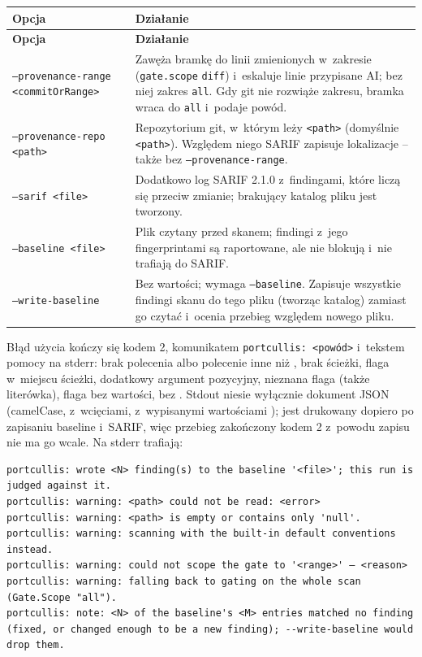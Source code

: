 \begingroup\small
\begin{xltabular}{\linewidth}{@{}>{\raggedright\arraybackslash}p{4.6cm} >{\raggedright\arraybackslash}X@{}}
\toprule
\textbf{Opcja} & \textbf{Działanie} \\
\midrule
\endfirsthead
\toprule
\textbf{Opcja} & \textbf{Działanie} \\
\midrule
\endhead
\texttt{--provenance-range <commitOrRange>} & Zawęża bramkę do linii zmienionych w~zakresie (\texttt{gate.scope} \texttt{diff}) i~eskaluje linie przypisane AI; bez niej zakres \texttt{all}. Gdy git nie rozwiąże zakresu, bramka wraca do \texttt{all} i~podaje powód. \\
\texttt{--provenance-repo <path>} & Repozytorium git, w~którym leży \texttt{<path>} (domyślnie \texttt{<path>}). Względem niego SARIF zapisuje lokalizacje -- także bez \texttt{--provenance-range}. \\
\texttt{--sarif <file>} & Dodatkowo log SARIF 2.1.0 z~findingami, które liczą się przeciw zmianie; brakujący katalog pliku jest tworzony. \\
\texttt{--baseline <file>} & Plik czytany przed skanem; findingi z~jego fingerprintami są raportowane, ale nie blokują i~nie trafiają do SARIF. \\
\texttt{--write-baseline} & Bez wartości; wymaga \texttt{--baseline}. Zapisuje wszystkie findingi skanu do tego pliku (tworząc katalog) zamiast go czytać i~ocenia przebieg względem nowego pliku. \\
\bottomrule
\end{xltabular}
\endgroup

Błąd użycia kończy się kodem 2, komunikatem \texttt{portcullis: <powód>} i~tekstem pomocy na
stderr: brak polecenia albo polecenie inne niż , brak ścieżki, flaga w~miejscu
ścieżki, dodatkowy argument pozycyjny, nieznana flaga (także literówka), flaga bez wartości,
 bez . Stdout niesie wyłącznie dokument JSON
(camelCase, z~wcięciami, z~wypisanymi wartościami ); jest drukowany dopiero po
zapisaniu baseline i~SARIF, więc przebieg zakończony kodem 2 z~powodu zapisu nie ma go wcale.
Na stderr trafiają:

\begin{lstlisting}
portcullis: wrote <N> finding(s) to the baseline '<file>'; this run is judged against it.
portcullis: warning: <path> could not be read: <error>
portcullis: warning: <path> is empty or contains only 'null'.
portcullis: warning: scanning with the built-in default conventions instead.
portcullis: warning: could not scope the gate to '<range>' — <reason>
portcullis: warning: falling back to gating on the whole scan (Gate.Scope "all").
portcullis: note: <N> of the baseline's <M> entries matched no finding (fixed, or changed enough to be a new finding); --write-baseline would drop them.
\end{lstlisting}

